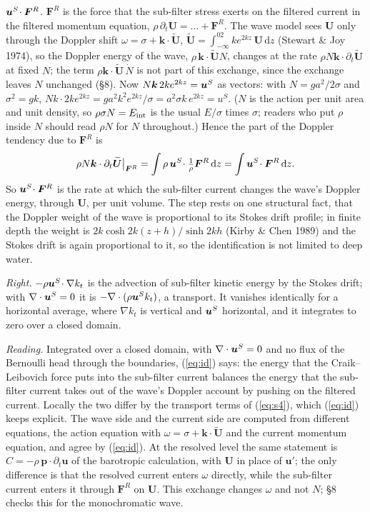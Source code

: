 \documentclass[10pt]{article}
\newcommand{\Ut}{\widetilde{\bm U}}
\newcommand{\bu}{\bm u}\newcommand{\bU}{\bm U}\newcommand{\bxi}{\bm\xi}\newcommand{\dd}{\mathrm d}
\begin{document}
\emph{$\bm u^S\!\cdot\bm F^R$.} $\bm F^R$ is the force that the sub-filter stress exerts on the filtered current in the filtered momentum equation, $\rho\,\partial_t\bU=\dots+\bm F^R$. The wave model sees $\bU$ only through the Doppler shift $\omega=\sigma+\bm k\cdot\Ut$, $\Ut=\int_{-\infty}^02ke^{2kz}\,\bU\,\dd z$ (Stewart \& Joy 1974), so the Doppler energy of the wave, $\rho\,\bm k\cdot\Ut N$, changes at the rate $\rho N\bm k\cdot\partial_t\Ut$ at fixed $N$; the term $\rho\bm k\cdot\Ut\,\dot N$ is not part of this exchange, since the exchange leaves $N$ unchanged (\S8). Now $N\bm k\,2ke^{2kz}=\bm u^S$ as vectors: with $N=ga^2/2\sigma$ and $\sigma^2=gk$, $Nk\cdot2ke^{2kz}=ga^2k^2e^{2kz}/\sigma=a^2\sigma k\,e^{2kz}=u^S$. ($N$ is the action per unit area and unit density, so $\rho\sigma N=E_{\rm int}$ is the usual $E/\sigma$ times $\sigma$; readers who put $\rho$ inside $N$ should read $\rho N$ for $N$ throughout.) Hence the part of the Doppler tendency due to $\bm F^R$ is
\[
\rho N\bm k\cdot\partial_t\Ut\big|_{\bm F^R}=\int\rho\,\uS\!\cdot\tfrac1\rho\bm F^R\,\dd z=\int\uS\!\cdot\bm F^R\,\dd z .
\]
So $\bm u^S\!\cdot\bm F^R$ is the rate at which the sub-filter current changes the wave's Doppler energy, through $\bU$, per unit volume. The step rests on one structural fact, that the Doppler weight of the wave is proportional to its Stokes drift profile; in finite depth the weight is $2k\cosh2k(z+h)/\sinh2kh$ (Kirby \& Chen 1989) and the Stokes drift is again proportional to it, so the identification is not limited to deep water.

\emph{Right.} $-\rho\bm u^S\!\cdot\nabla k_t$ is the advection of sub-filter kinetic energy by the Stokes drift; with $\nabla\cdot\bm u^S=0$ it is $-\nabla\cdot(\rho\bm u^S k_t)$, a transport. It vanishes identically for a horizontal average, where $\nabla k_t$ is vertical and $\bm u^S$ horizontal, and it integrates to zero over a closed domain.

\emph{Reading.} Integrated over a closed domain, with $\nabla\cdot\bm u^S=0$ and no flux of the Bernoulli head through the boundaries, (\ref{eq:id}) says: the energy that the Craik--Leibovich force puts into the sub-filter current balances the energy that the sub-filter current takes out of the wave's Doppler account by pushing on the filtered current. Locally the two differ by the transport terms of (\ref{eq:s4}), which (\ref{eq:id}) keeps explicit. The wave side and the current side are computed from different equations, the action equation with $\omega=\sigma+\bm k\cdot\Ut$ and the current momentum equation, and agree by (\ref{eq:id}). At the resolved level the same statement is $C=-\rho\,\bm p\cdot\partial_t\bu$ of the barotropic calculation, with $\bU$ in place of $\bu'$; the only difference is that the resolved current enters $\omega$ directly, while the sub-filter current enters it through $\bm F^R$ on $\bU$. This exchange changes $\omega$ and not $N$; \S8 checks this for the monochromatic wave.
\end{document}
